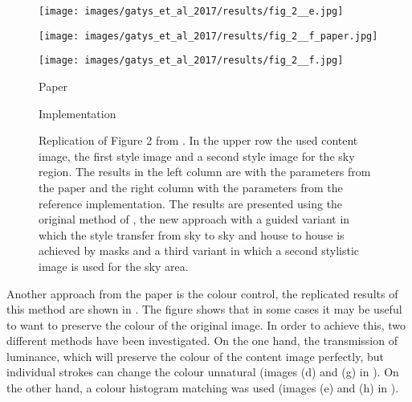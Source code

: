 \begin{figure}[H]
\begin{minipage}[t]{0.45\textwidth}
\end{minipage}
\hfill%
\begin{minipage}[t]{0.45\textwidth}
	\centering
	\texttt{[image: images/gatys\_et\_al\_2017/results/fig\_2\_\_e.jpg]}
\end{minipage}
\hfill%
\begin{minipage}[t]{0.45\textwidth}
	\centering
	\texttt{[image: images/gatys\_et\_al\_2017/results/fig\_2\_\_f\_paper.jpg]}
\end{minipage}
\hfill%
\begin{minipage}[t]{0.45\textwidth}
	\centering
	\texttt{[image: images/gatys\_et\_al\_2017/results/fig\_2\_\_f.jpg]}
\end{minipage}
	\hfill%
\begin{minipage}[t]{0.45\textwidth}
	\centering
	Paper
\end{minipage}
\hfill%
\begin{minipage}[t]{0.45\textwidth}
	\centering
	Implementation
\end{minipage}
\caption{Replication of Figure 2 from \cite{GEB+2017}. In the upper row the used content image, the first style image and a second style image for the sky region. The results in the left column are with the parameters from the paper and the right column with the parameters from the reference implementation.  The results are presented using the original method of \cite{GEB2016}, the new approach with a guided variant in which the style transfer from sky to sky and house to house is achieved by masks and a third variant in which a second stylistic image is used for the sky area.}
\label{fig:GEB+2017_fig2}
\end{figure}

Another approach from the paper is the colour control, the replicated results of this method are shown in . The figure shows that in some cases it may be useful to want to preserve the colour of the original image. In order to achieve this, two different methods have been investigated. On the one hand, the transmission of luminance, which will preserve the colour of the content image perfectly, but individual strokes can change the colour unnatural (images (d)  and (g) in ). On the other hand, a colour histogram matching was used (images (e)  and (h) in ).

